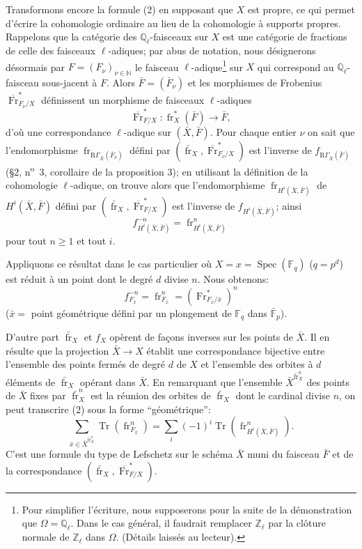 \documentclass[11pt]{article}
\DeclareMathOperator{\Spec}{Spec}
\newcommand{\R}{\mathrm{R}}\newcommand{\RHomCore}{\mathrm{RHom}}
\providecommand{\Tr}{\operatorname{Tr}}
\providecommand{\Tr}{\operatorname{Tr}}
\providecommand{\Tr}{\operatorname{Tr}}
\providecommand{\R}{\mathrm R}
\providecommand{\Tr}{\operatorname{Tr}}
\providecommand{\Spec}{\operatorname{Spec}}
\providecommand{\Spec}{\operatorname{Spec}}
\providecommand{\Spec}{\operatorname{Spec}}
\providecommand{\Tr}{\operatorname{Tr}}
\providecommand{\fr}{\operatorname{fr}}
\providecommand{\Fr}{\operatorname{Fr}}
\providecommand{\Fr}{\operatorname{Fr}}
\providecommand{\fr}{\operatorname{fr}}
\providecommand{\Spec}{\operatorname{Spec}}
\begin{document}
Transformons encore la formule (2) en supposant que $X$ est propre, ce qui permet d'écrire la cohomologie ordinaire au lieu de la cohomologie à supports propres. Rappelons que la catégorie des $\mathbb Q_\ell$-faisceaux sur $X$ est une catégorie de fractions de celle des faisceaux $\ell$-adiques; par abus de notation, nous désignerons désormais par $F=(F_\nu)_{\nu\in\mathbb N}$ le faisceau $\ell$-adique\footnote{Pour simplifier l'écriture, nous supposerons pour la suite de la démonstration que $\Omega=\mathbb Q_\ell$. Dans le cas général, il faudrait remplacer $\mathbb Z_\ell$ par la clôture normale de $\mathbb Z_\ell$ dans $\Omega$. (Détails laissés au lecteur).} sur $X$ qui correspond au $\mathbb Q_\ell$-faisceau sous-jacent à $F$. Alors $\bar F=(\bar F_\nu)$ et les morphismes de Frobenius $\overline{\Fr}^*_{F_\nu/X}$ définissent un morphisme de faisceaux $\ell$-adiques
\[
\overline{\Fr}^*_{F/X}:\fr_X^*(\bar F)\longrightarrow\bar F,
\]
d'où une correspondance $\ell$-adique sur $(\bar X,\bar F)$. Pour chaque entier $\nu$ on sait que l'endomorphisme $\fr_{\R\Gamma_{\bar X}(\bar F_\nu)}$ défini par $(\bar{\fr}_X,\overline{\Fr}^*_{F_\nu/X})$ est l'inverse de $f_{\R\Gamma_{\bar X}(\bar F)}$ (§2, n\textsuperscript{o}~3, corollaire de la proposition 3); en utilisant la définition de la cohomologie $\ell$-adique, on trouve alors que l'endomorphisme $\fr_{H^i(\bar X,\bar F)}$ de $H^i(\bar X,\bar F)$ défini par $(\bar{\fr}_X,\overline{\Fr}^*_{F/X})$ est l'inverse de $f_{H^i(\bar X,\bar F)}$; ainsi
\[
f^{-n}_{H^i(\bar X,\bar F)}=\fr^n_{H^i(\bar X,\bar F)}
\]
pour tout $n\ge1$ et tout $i$.

Appliquons ce résultat dans le cas particulier où $X=x=\Spec(\mathbb F_q)$ ($q=p^d$) est réduit à un point dont le degré $d$ divise $n$. Nous obtenons:
\[
f^{-n}_{F_{\bar x}}=\fr^n_{F_{\bar x}}=(\Fr^*_{F_{\bar x}/\bar x})^n
\]
($\bar x=$ point géométrique défini par un plongement de $\mathbb F_q$ dans $\bar{\mathbb F}_p$).

D'autre part $\bar{\fr}_X$ et $f_X$ opèrent de façons inverses sur les points de $\bar X$. Il en résulte que la projection $\bar X\to X$ établit une correspondance bijective entre l'ensemble des points fermés de degré $d$ de $X$ et l'ensemble des orbites à $d$ éléments de $\bar{\fr}_X$ opérant dans $\bar X$. En remarquant que l'ensemble $\bar X^{\bar{\fr}_X^n}$ des points de $\bar X$ fixes par $\bar{\fr}_X^n$ est la réunion des orbites de $\bar{\fr}_X$ dont le cardinal divise $n$, on peut transcrire (2) sous la forme ``géométrique'':
\[
\sum_{\bar x\in\bar X^{\bar{\fr}_X^n}}\Tr(\fr^n_{F_{\bar x}})
=\sum_i(-1)^i\Tr(\fr^n_{H^i(\bar X,\bar F)}).
\tag{2'}
\]
C'est une formule du type de Lefschetz sur le schéma $\bar X$ muni du faisceau $\bar F$ et de la correspondance $(\bar{\fr}_X,\overline{\Fr}^*_{F/X})$.
\end{document}
